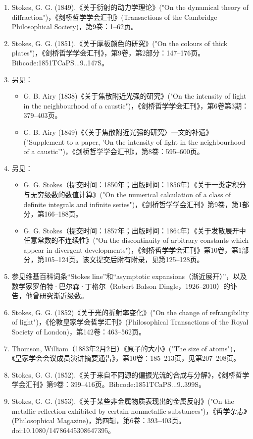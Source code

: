 \begin{enumerate}
\item Stokes, G. G. (1849).《关于衍射的动力学理论》("On the dynamical theory of diffraction")，《剑桥哲学学会汇刊》(Transactions of the Cambridge Philosophical Society)，第9卷：1–62页。
\item Stokes, G. G. (1851).《关于厚板颜色的研究》("On the colours of thick plates")，《剑桥哲学学会汇刊》，第9卷，第2部分：147–176页。Bibcode:1851TCaPS...9..147S。
\item 另见：
\begin{itemize}
\item G. B. Airy (1838)《关于焦散附近光强的研究》("On the intensity of light in the neighbourhood of a caustic")，《剑桥哲学学会汇刊》，第6卷第3期：379–403页。
\item G. B. Airy (1849)《〈关于焦散附近光强的研究〉一文的补遗》("Supplement to a paper, 'On the intensity of light in the neighbourhood of a caustic'")，《剑桥哲学学会汇刊》，第8卷：595–600页。
\end{itemize}
\item 另见：
\begin{itemize}
\item G. G. Stokes（提交时间：1850年；出版时间：1856年）《关于一类定积分与无穷级数的数值计算》("On the numerical calculation of a class of definite integrals and infinite series")，《剑桥哲学学会汇刊》第9卷，第1部分，第166–188页。
\item G. G. Stokes（提交时间：1857年；出版时间：1864年）《关于发散展开中任意常数的不连续性》("On the discontinuity of arbitrary constants which appear in divergent developments")，《剑桥哲学学会汇刊》第10卷，第1部分，第105–124页。该文提交后附有附录，见第125–128页。
\end{itemize}
\item 参见维基百科词条“Stokes line”和“asymptotic expansions（渐近展开）”，以及数学家罗伯特·巴尔森·丁格尔（Robert Balson Dingle，1926–2010）的讣告，他曾研究渐近级数。
\item Stokes, G. G. (1852)《关于光的折射率变化》("On the change of refrangibility of light")，《伦敦皇家学会哲学汇刊》(Philosophical Transactions of the Royal Society of London)，第142卷：463–562页。
\item Thomson, William（1883年2月2日）《原子的大小》("The size of atoms")，《皇家学会会议成员演讲摘要通告》，第10卷：185–213页，见第207–208页。
\item Stokes, G. G. (1852).《关于来自不同源的偏振光流的合成与分解》，《剑桥哲学学会汇刊》第9卷：399–416页。Bibcode:1851TCaPS...9..399S。
\item Stokes, G. G. (1853).《关于某些非金属物质表现出的金属反射》("On the metallic reflection exhibited by certain nonmetallic substances")，《哲学杂志》(Philosophical Magazine)，第四辑，第6卷：393–403页。doi:10.1080/14786445308647395。

\end{enumerate}
